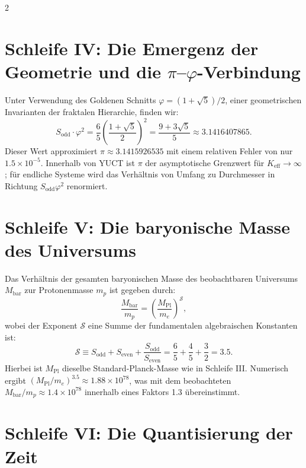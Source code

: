 \documentclass[12pt,a4paper]{article}
\newcommand{\Keff}{K_{\mathrm{eff}}}
\begin{document}
	\begin{multicols}{2}
		\section{Schleife IV: Die Emergenz der Geometrie und die \(\pi\)–\(\varphi\)-Verbindung}
		
		Unter Verwendung des Goldenen Schnitts \(\varphi = (1+\sqrt{5})/2\), einer geometrischen Invarianten der fraktalen Hierarchie, finden wir:
		\begin{equation}
			S_{\mathrm{odd}} \cdot \varphi^2 = \frac{6}{5} \left( \frac{1+\sqrt{5}}{2} \right)^2 = \frac{9+3\sqrt{5}}{5} \approx 3.1416407865.
		\end{equation}
		Dieser Wert approximiert \(\pi \approx 3.1415926535\) mit einem relativen Fehler von nur \(1.5 \times 10^{-5}\). Innerhalb von YUCT ist \(\pi\) der asymptotische Grenzwert für \(\Keff \to \infty\); für endliche Systeme wird das Verhältnis von Umfang zu Durchmesser in Richtung \(S_{\mathrm{odd}}\varphi^2\) renormiert.
		
		\section{Schleife V: Die baryonische Masse des Universums}
		
		Das Verhältnis der gesamten baryonischen Masse des beobachtbaren Universums \(M_{\mathrm{bar}}\) zur Protonenmasse \(m_p\) ist gegeben durch:
		\begin{equation}
			\frac{M_{\mathrm{bar}}}{m_p} = \left( \frac{M_{\mathrm{Pl}}}{m_e} \right)^{\mathcal{S}},
		\end{equation}
		wobei der Exponent \(\mathcal{S}\) eine Summe der fundamentalen algebraischen Konstanten ist:
		\begin{equation}
			\mathcal{S} \equiv S_{\mathrm{odd}} + S_{\mathrm{even}} + \frac{S_{\mathrm{odd}}}{S_{\mathrm{even}}} = \frac{6}{5} + \frac{4}{5} + \frac{3}{2} = 3.5.
		\end{equation}
		Hierbei ist \(M_{\mathrm{Pl}}\) dieselbe Standard-Planck-Masse wie in Schleife III. Numerisch ergibt \((M_{\mathrm{Pl}}/m_e)^{3.5} \approx 1.88 \times 10^{78}\), was mit dem beobachteten \(M_{\mathrm{bar}}/m_p \approx 1.4 \times 10^{78}\) innerhalb eines Faktors 1.3 übereinstimmt.
		
		\section{Schleife VI: Die Quantisierung der Zeit}
		

\end{multicols}
\end{document}
